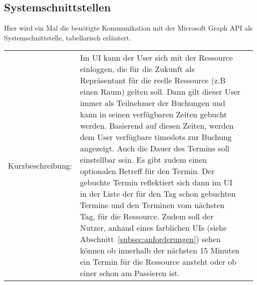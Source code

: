 \subsection{Systemschnittstellen}\label{subsec:systemschnittstellen}
Hier wird ein Mal die benötigte Kommunikation mit der Microsoft Graph API als Systemschnittstelle, tabellarisch erläutert.
\newline
\newline
\begin{tabularx}{\textwidth\footnotesize}{|l*{2}{|X}|} \hline
    \caption{Termin buchen}
    \label{tab:TerminBuchen}
 Kurzbeschreibung: & Im UI kann der User sich mit der Ressource einloggen, die für die Zukunft als Repräsentant für die reelle Ressource (z.B einen Raum) gelten soll.
    Dann gilt dieser User immer als Teilnehmer der Buchungen und kann in seinen verfügbaren Zeiten gebucht werden.
    Basierend auf diesen Zeiten, werden dem User verfügbare timeslots zur Buchung angezeigt.
    Auch die Dauer des Termins soll einstellbar sein.
    Es gibt zudem einen optionalen Betreff für den Termin.
    Der gebuchte Termin reflektiert sich dann im UI in der Liste der für den Tag schon gebuchten Termine und den Terminen vom nächsten Tag, für die Ressource.
    Zudem soll der Nutzer, anhand eines farblichen UIs (siehe Abschnitt~\ref{subsec:anforderungen}) sehen können ob innerhalb der nächsten 15 Minuten ein Termin für die Ressource ansteht oder ob einer schon am Passieren ist.


\end{tabularx}
